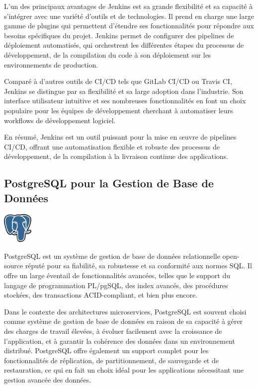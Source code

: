 \documentclass[a4paper, 11pt, openany]{report}
\begin{document}
L'un des principaux avantages de Jenkins est sa grande flexibilité et sa capacité à s'intégrer avec une variété d'outils et de technologies. Il prend en charge une large gamme de plugins qui permettent d'étendre ses fonctionnalités pour répondre aux besoins spécifiques du projet. Jenkins permet de configurer des pipelines de déploiement automatisés, qui orchestrent les différentes étapes du processus de développement, de la compilation du code à son déploiement sur les environnements de production.

Comparé à d'autres outils de CI/CD tels que GitLab CI/CD ou Travis CI, Jenkins se distingue par sa flexibilité et sa large adoption dans l'industrie. Son interface utilisateur intuitive et ses nombreuses fonctionnalités en font un choix populaire pour les équipes de développement cherchant à automatiser leurs workflows de développement logiciel.

En résumé, Jenkins est un outil puissant pour la mise en œuvre de pipelines CI/CD, offrant une automatisation flexible et robuste des processus de développement, de la compilation à la livraison continue des applications.


\subsection{PostgreSQL pour la Gestion de Base de Données}
\begin{center}
\includegraphics[height=1.5cm]{postgres.png}
\end{center}

PostgreSQL est un système de gestion de base de données relationnelle open-source réputé pour sa fiabilité, sa robustesse et sa conformité aux normes SQL. Il offre un large éventail de fonctionnalités avancées, telles que le support du langage de programmation PL/pgSQL, des index avancés, des procédures stockées, des transactions ACID-compliant, et bien plus encore.

Dans le contexte des architectures microservices, PostgreSQL est souvent choisi comme système de gestion de base de données en raison de sa capacité à gérer des charges de travail élevées, à évoluer facilement avec la croissance de l'application, et à garantir la cohérence des données dans un environnement distribué. PostgreSQL offre également un support complet pour les fonctionnalités de réplication, de partitionnement, de sauvegarde et de restauration, ce qui en fait un choix idéal pour les applications nécessitant une gestion avancée des données.
\end{document}
